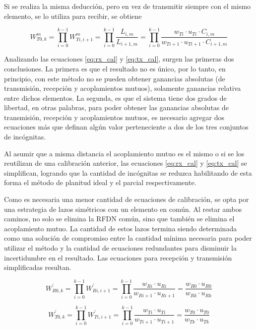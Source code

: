 Si se realiza la misma deducción, pero en vez de transmitir siempre con el mismo elemento, se lo utiliza para recibir, se obtiene

\begin{equation}
	W^{m}_{T0,k} = \prod_{i=0}^{k-1} W^{m}_{Ti,i+1} = \prod_{i=0}^{k-1}\dfrac{L_{i,m}}{L_{i+1, m}} =
		\prod_{i=0}^{k-1}\dfrac{w_{Ti} \cdot u_{Ti} \cdot C_{i,m}}{w_{Ti + 1} \cdot u_{Ti + 1} \cdot C_{i + 1, m}}
	\label{eq:tx_cal}
\end{equation}

Analizando las ecuaciones \ref{eq:rx_cal} y \ref{eq:tx_cal}, surgen las primeras dos conclusiones. La primera es que el
resultado no es único, por lo tanto, en principio, con este método no se pueden obtener ganancias absolutas (de transmisión,
recepción y acoplamientos mutuos), solamente ganancias relativa entre dichos elementos. La segunda, es que el sistema tiene
dos grados de libertad, en otras palabras, para poder obtener las ganancias absolutas de transmisión, recepción y acoplamientos
mutuos, es necesario agregar dos ecuaciones más que definan algún valor perteneciente a dos de los tres conjuntos de incógnitas.

Al asumir que a misma distancia el acoplamiento mutuo es el mismo o si se los reutilizan de una calibración anterior, las
ecuaciones \ref{eq:rx_cal} y \ref{eq:tx_cal} se simplifican, logrando que la cantidad de incógnitas se reduzca habilitando
de esta forma el método de planitud ideal y el parcial respectivamente.

Como es necesaria una menor cantidad de ecuaciones de calibración, se opta por una estrategia de lazos simétricos con un
elemento en común. Al restar ambos caminos, no solo se elimina la RFDN común, sino que también se elimina el
acoplamiento mutuo. La cantidad de estos lazos termina siendo determinada como una solución de compromiso entre la cantidad 
mínima necesaria para poder utilizar el método y la cantidad de ecuaciones redundantes para disminuir la incertidumbre en el
resultado. Las ecuaciones para recepción y transmisión simplificadas resultan.

\begin{equation}
	W^{'}_{R0,k} = \prod_{i=0}^{k-1} W^{'}_{Ri,i+1} = \prod_{i=0}^{k-1}\dfrac{w_{Ri} \cdot u_{Ri}}{w_{Ri + 1} \cdot u_{Ri + 1}} =
	\dfrac{w_{R0} \cdot u_{R0}}{w_{Rk} \cdot u_{Rk}}
	\label{eq:rx_simp_cal}
\end{equation}

\begin{equation}
	W^{'}_{T0,k} = \prod_{i=0}^{k-1} W^{'}_{Ti,i+1} = \prod_{i=0}^{k-1}\dfrac{w_{Ti} \cdot u_{Ti}}{w_{Ti + 1} \cdot u_{Ti + 1}} =
	\dfrac{w_{T0} \cdot u_{T0}}{w_{Tk} \cdot u_{Tk}}
	\label{eq:tx_simp_cal}
\end{equation}

